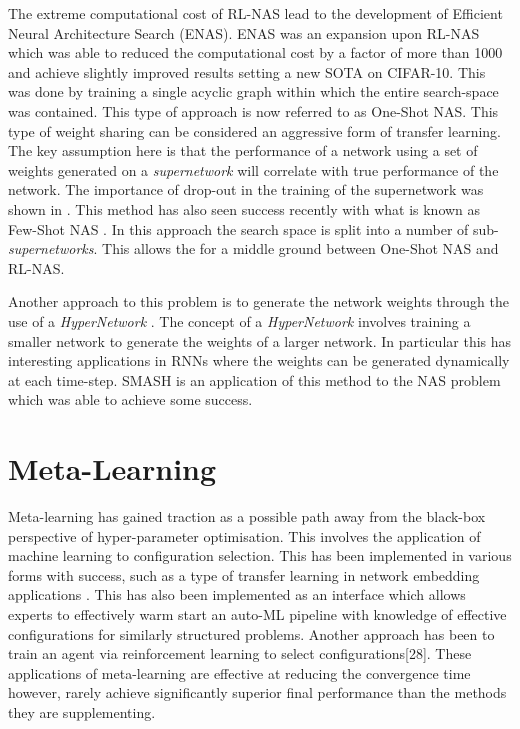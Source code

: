   
	The extreme computational cost of RL-NAS lead to the development of Efficient Neural Architecture Search (ENAS). ENAS \cite{ENAS} was an expansion upon RL-NAS which was able to reduced the computational cost by a factor of more than 1000 and achieve slightly improved results setting a new SOTA on CIFAR-10. This was done by training a single acyclic graph within which the entire search-space was contained. This type of approach is now referred to as One-Shot NAS. This type of weight sharing can be considered an aggressive form of transfer learning. The key assumption here is that the performance of a network using a set of weights generated on a \textit{supernetwork} will correlate with true performance of the network. The importance of drop-out in the training of the supernetwork was shown in \cite{ENAS-T}. This method has also seen success recently with what is known as Few-Shot NAS \cite{fewshot}. In this approach the search space is split into a number of sub-\textit{supernetworks}. This allows the for a middle ground between One-Shot NAS and RL-NAS. 
	\par
	Another approach to this problem is to generate the network weights through the use of a \textit{HyperNetwork} \cite{hypernetworks}. The concept of a \textit{HyperNetwork} involves training a smaller network to generate the weights of a larger network. In particular this has interesting applications in RNNs where the weights can be generated dynamically at each time-step. SMASH \cite{smash} is an application of this method to the NAS problem which was able to achieve some success.  






    


\newpage
\section{Meta-Learning}

	Meta-learning has gained traction as a possible path away from the black-box perspective of hyper-parameter optimisation. This involves the application of machine learning to configuration selection. This has been implemented in various forms with success, such as a type of transfer learning in network embedding applications \cite{9}. This has also been implemented as an interface which allows experts to effectively warm start an auto-ML pipeline with knowledge of effective configurations for similarly structured problems\cite{29}. Another approach has been to train an agent via reinforcement learning to select configurations[28]. These applications of meta-learning are effective at reducing the convergence time however, rarely achieve significantly superior final performance than the methods they are supplementing.\cite{31}\cite{29}









